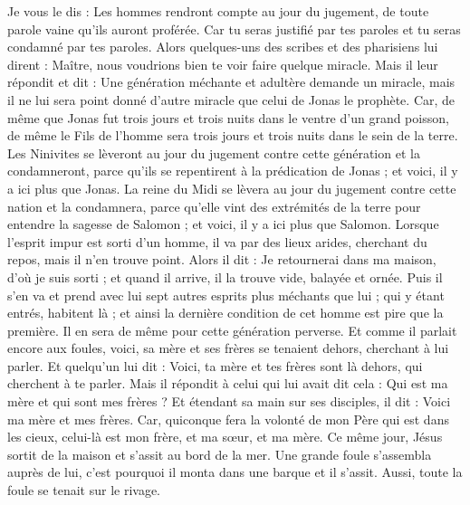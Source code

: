 \begin{multicols}{2}
Je vous le dis : Les hommes rendront compte au jour du jugement, de toute parole vaine qu'ils auront proférée.
Car tu seras justifié par tes paroles et tu seras condamné par tes paroles.
Alors quelques-uns des scribes et des pharisiens lui dirent : Maître, nous voudrions bien te voir faire quelque miracle.
Mais il leur répondit et dit : Une génération méchante et adultère demande un miracle, mais il ne lui sera point donné d'autre miracle que celui de Jonas le prophète.
Car, de même que Jonas fut trois jours et trois nuits dans le ventre d'un grand poisson, de même le Fils de l'homme sera trois jours et trois nuits dans le sein de la terre.
Les Ninivites se lèveront au jour du jugement contre cette génération et la condamneront, parce qu'ils se repentirent à la prédication de Jonas ; et voici, il y a ici plus que Jonas.
La reine du Midi se lèvera au jour du jugement contre cette nation et la condamnera, parce qu'elle vint des extrémités de la terre pour entendre la sagesse de Salomon ; et voici, il y a ici plus que Salomon.
Lorsque l'esprit impur est sorti d'un homme, il va par des lieux arides, cherchant du repos, mais il n'en trouve point.
Alors il dit : Je retournerai dans ma maison, d'où je suis sorti ; et quand il arrive, il la trouve vide, balayée et ornée.
Puis il s'en va et prend avec lui sept autres esprits plus méchants que lui ; qui y étant entrés, habitent là ; et ainsi la dernière condition de cet homme est pire que la première. Il en sera de même pour cette génération perverse.
Et comme il parlait encore aux foules, voici, sa mère et ses frères se tenaient dehors, cherchant à lui parler.
Et quelqu'un lui dit : Voici, ta mère et tes frères sont là dehors, qui cherchent à te parler.
Mais il répondit à celui qui lui avait dit cela : Qui est ma mère et qui sont mes frères ?
Et étendant sa main sur ses disciples, il dit : Voici ma mère et mes frères.
Car, quiconque fera la volonté de mon Père qui est dans les cieux, celui-là est mon frère, et ma sœur, et ma mère.
\VerseOne{}Ce même jour, Jésus sortit de la maison et s'assit au bord de la mer.
Une grande foule s'assembla auprès de lui, c'est pourquoi il monta dans une barque et il s'assit. Aussi, toute la foule se tenait sur le rivage.

\end{multicols}
